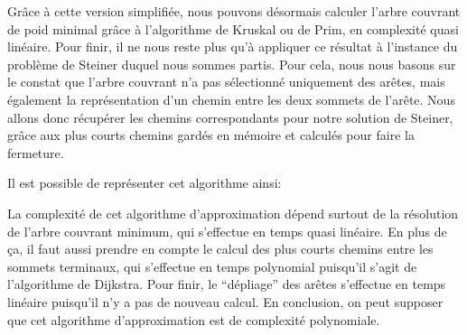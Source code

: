 \documentclass{article}
\begin{document}
Grâce à cette version simplifiée, nous pouvons désormais calculer l'arbre couvrant de poid minimal grâce à l'algorithme de Kruskal ou de Prim, en complexité quasi linéaire. Pour finir, il ne nous reste plus qu'à appliquer ce résultat à l'instance du problème de Steiner duquel nous sommes partis. Pour cela, nous nous basons sur le constat que l'arbre couvrant n'a pas sélectionné uniquement des arêtes, mais également la représentation d'un chemin entre les deux sommets de l'arête. Nous allons donc récupérer les chemins correspondants pour notre solution de Steiner, grâce aux plus courts chemins gardés en mémoire et calculés pour faire la fermeture. \\ \par

Il est possible de représenter cet algorithme ainsi:
\vspace{1cm}
\begin{center}
\end{center}
\vspace{1cm}

La complexité de cet algorithme d'approximation dépend surtout de la résolution de l'arbre couvrant minimum, qui s'effectue en temps quasi linéaire. En plus de ça, il faut aussi prendre en compte le calcul des plus courts chemins entre les sommets terminaux, qui s'effectue en temps polynomial puisqu'il s'agit de l'algorithme de Dijkstra. Pour finir, le ``dépliage'' des arêtes s'effectue en temps linéaire puisqu'il n'y a pas de nouveau calcul. En conclusion, on peut supposer que cet algorithme d'approximation est de complexité polynomiale.
\end{document}
